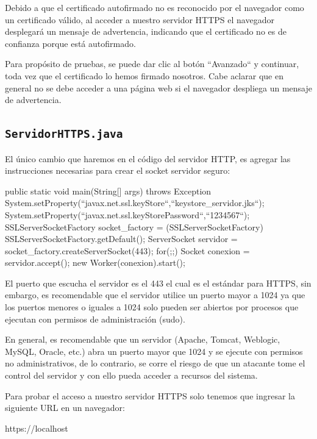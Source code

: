 Debido a que el certificado autofirmado no es reconocido por el navegador como un certificado válido, al acceder a nuestro servidor HTTPS el navegador desplegará un mensaje de advertencia, indicando que el certificado no es de confianza porque está autofirmado.

Para propósito de pruebas, se puede dar clic al botón ``Avanzado`` y continuar, toda vez que el certificado lo hemos firmado nosotros. Cabe aclarar que en general no se debe acceder a una página web si el navegador despliega un mensaje de advertencia.

\subsection{\texttt{ServidorHTTPS.java}}

El único cambio que haremos en el código del servidor HTTP, es agregar las instrucciones necesarias para crear el socket servidor seguro:

\begin{SourceCode}
public static void main(String[] args) throws Exception
{
    System.setProperty(``javax.net.ssl.keyStore``,``keystore_servidor.jks``);
    System.setProperty(``javax.net.ssl.keyStorePassword``,``1234567``);
    SSLServerSocketFactory socket_factory = (SSLServerSocketFactory)
                                            SSLServerSocketFactory.getDefault();
    ServerSocket servidor = socket_factory.createServerSocket(443);
    for(;;)
    {
      Socket conexion = servidor.accept();
      new Worker(conexion).start();
    }
}
\end{SourceCode}

El puerto que escucha el servidor es el 443 el cual es el estándar para HTTPS, sin embargo, es recomendable que el servidor utilice un puerto mayor a 1024 ya que los puertos menores o iguales a 1024 solo pueden ser abiertos por procesos que ejecutan con permisos de administración (sudo).

En general, es recomendable que un servidor (Apache, Tomcat, Weblogic, MySQL, Oracle, etc.) abra un puerto mayor que 1024 y se ejecute con permisos no administrativos, de lo contrario, se corre el riesgo de que un atacante tome el control del servidor y con ello pueda acceder a recursos del sistema.

Para probar el acceso a nuestro servidor HTTPS solo tenemos que ingresar la siguiente URL en un navegador:

\begin{SourceCode}
https://localhost
\end{SourceCode}

